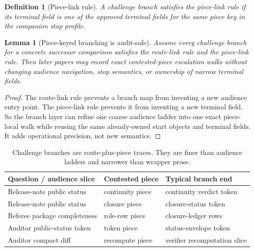 \documentclass[11pt]{article}
\newtheorem{definition}{Definition}
\newtheorem{lemma}{Lemma}
\begin{document}
\begin{definition}[Piece-link rule]
A challenge branch satisfies the \emph{piece-link rule} if its terminal field is one of the approved terminal fields for the same piece key in the companion stop profile.
\end{definition}

\begin{lemma}[Piece-keyed branching is audit-safe]
Assume every challenge branch for a concrete successor comparison satisfies the route-link rule and the piece-link rule.
Then later papers may record exact contested-piece escalation walks without changing audience navigation, stop semantics, or ownership of narrow terminal fields.
\end{lemma}

\begin{proof}
The route-link rule prevents a branch map from inventing a new audience entry point.
The piece-link rule prevents it from inventing a new terminal field.
So the branch layer can refine one coarse audience ladder into one exact piece-local walk while reusing the same already-owned start objects and terminal fields.
It adds operational precision, not new semantics.
\end{proof}

\begin{table}[t]
\centering
\small
\begin{tabularx}{\linewidth}{@{}l X X@{}}
\toprule
Question / audience slice & Contested piece & Typical branch end \\
\midrule
Release-note public status & continuity piece & continuity verdict token \\
Release-note public status & closure piece & closure-status token \\
Referee package completeness & role-row piece & closure-ledger rows \\
Auditor public-status token & token piece & status-envelope token \\
Auditor compact diff & recompute piece & verifier recomputation slice \\
\bottomrule
\end{tabularx}
\caption{Challenge branches are route-plus-piece traces. They are finer than audience ladders and narrower than wrapper prose.}
\label{tab:branchmap}
\end{table}
\end{document}
